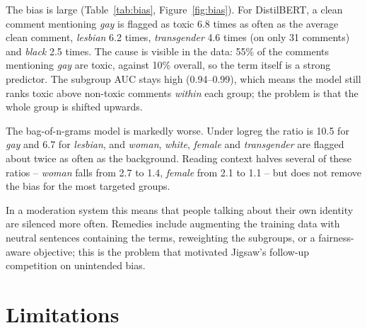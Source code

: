 \documentclass[11pt,a4paper]{article}
\begin{document}
The bias is large (Table~\ref{tab:bias}, Figure~\ref{fig:bias}).  For
DistilBERT, a clean comment mentioning \emph{gay} is flagged as toxic 6.8
times as often as the average clean comment, \emph{lesbian} 6.2 times,
\emph{transgender} 4.6 times (on only 31 comments) and \emph{black} 2.5 times.
The cause is visible in the data: 55\% of the comments mentioning \emph{gay}
are toxic, against 10\% overall, so the term itself is a strong predictor.
The subgroup AUC stays high (0.94--0.99), which means the model still ranks
toxic above non-toxic comments \emph{within} each group; the problem is that
the whole group is shifted upwards.

The bag-of-n-grams model is markedly worse.  Under logreg the ratio is 10.5 for
\emph{gay} and 6.7 for \emph{lesbian}, and \emph{woman}, \emph{white},
\emph{female} and \emph{transgender} are flagged about twice as often as the
background.  Reading context halves several of these ratios -- \emph{woman}
falls from 2.7 to 1.4, \emph{female} from 2.1 to 1.1 -- but does not remove
the bias for the most targeted groups.

In a moderation system this means that people talking about their own identity
are silenced more often.  Remedies include augmenting the training data with
neutral sentences containing the terms, reweighting the subgroups, or a
fairness-aware objective; this is the problem that motivated Jigsaw's follow-up
competition on unintended bias.

\section{Limitations}
\end{document}
